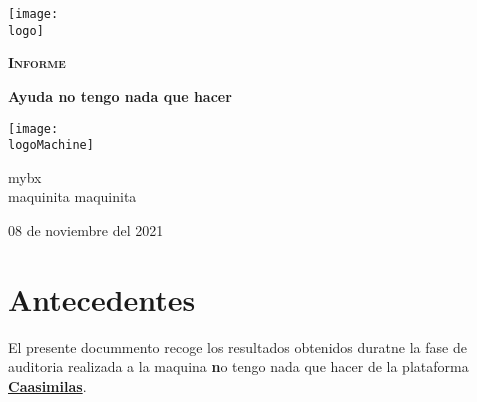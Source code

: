 \documentclass[a4paper]{article} %
\newcommand{\logo}{~/null/2021-11-07-213216_635x221_scrot.png}
\newcommand{\machineName}{no tengo nada que hacer}
\newcommand{\logoMachine}{~/null/pexels-tima-miroshnichenko-5380664.jpg}
\newcommand{\startDate}{08 de noviembre del 2021}
\begin{document}
    \cfoot{\thepage} %
    \begin{titlepage}
    \centering

    \texttt{[image: \\logo]}\par\vspace{1cm}
    {\scshape\LARGE \textbf{Informe}\par}
    \vspace{0.3cm}
    {\Huge\bfseries\textcolor{greenPortada}{Ayuda \machineName}\par}
    \vfill %

    \texttt{[image: \\logoMachine]}\par\vspace{1cm}
    \vfill

        \begin{tcolorbox}[colback=red!5!white,colframe=red!75!black]
            \centering
            mybx\\maquinita maquinita
        \end{tcolorbox}
        \vfill\vfill

    {\large \startDate\par}

    \end{titlepage}

    \clearpage
    \tableofcontents
    \clearpage
    \clearpage
    \listoffigures
    \clearpage
   \section{Antecedentes} 
   El presente docummento recoge los resultados obtenidos duratne la fase de auditoria realizada 
   a la maquina {\textbf\machineName} de la plataforma \href{https://caasimilas.com}{\textbf{\color{blue}Caasimilas}}.  
\end{document}
